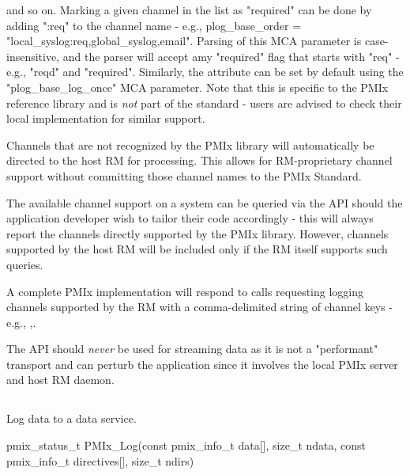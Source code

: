 and so on. Marking a given channel in the list as "required" can be done by adding ":req" to the channel name - e.g., plog_base_order = "local_syslog:req,global_syslog,email". Parsing of this MCA parameter is case-insensitive, and the parser will accept amy "required" flag that starts with "req" - e.g., "reqd" and "required". Similarly, the  attribute can be set by default using the "plog_base_log_once" MCA parameter. Note that this is specific to the PMIx reference library and is \emph{not} part of the standard - users are advised to check their local implementation for similar support.

Channels that are not recognized by the PMIx library will automatically be directed to the host RM for processing. This allows for \ac{RM}-proprietary channel support without committing those channel names to the \ac{PMIx} Standard.

\adviceuserstart
The available channel support on a system can be queried via the  \ac{API} should the application developer wish to tailor their code accordingly - this will always report the channels directly supported by the \ac{PMIx} library. However, channels supported by the host \ac{RM} will be included only if the \ac{RM} itself supports such queries.
\adviceuserend

\adviceimplstart
A complete \ac{PMIx} implementation will respond to  calls requesting logging channels supported by the \ac{RM} with a comma-delimited string of channel keys - e.g., ,.
\adviceimplend

\adviceuserstart
The  API should \emph{never} be used for streaming data as it is not a "performant" transport and can perturb the application since it involves the local \ac{PMIx} server and host RM daemon.
\adviceuserend


\subsection{}

\summary

Log data to a data service.

\format

\cspecificstart
\begin{codepar}
pmix_status_t
PMIx_Log(const pmix_info_t data[], size_t ndata,
         const pmix_info_t directives[], size_t ndirs)
\end{codepar}
\cspecificend

